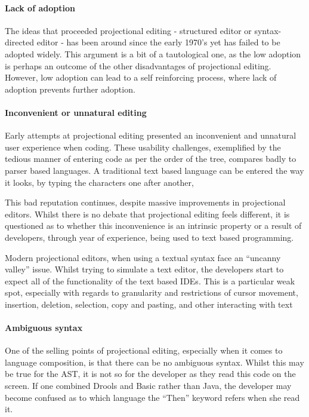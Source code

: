 \paragraph{Lack of adoption}
The ideas that proceeded projectional editing - structured editor or syntax-directed editor - has been around since the early 1970's yet has failed to be adopted widely.
This argument is a bit of a tautological one, as the low adoption is perhaps an outcome of the other disadvantages of projectional editing.
However, low adoption can lead to a self reinforcing process, where lack of adoption prevents further adoption.

\paragraph{Inconvenient or unnatural editing}
Early attempts at projectional editing presented an inconvenient and unnatural user experience when coding.
These usability challenges, exemplified by the tedious manner of entering code as per the order of the tree, compares badly to parser based languages.
A traditional text based language can be entered the way it looks, by typing the characters one after another,

This bad reputation continues, despite massive improvements in projectional editors.
Whilst there is no debate that projectional editing feels different, it is questioned as to whether this inconvenience is an intrinsic property or a result of developers, through year of experience, being used to text based programming.

Modern projectional editors, when using a textual syntax face an ``uncanny valley'' issue.
Whilst trying to simulate a text editor, the developers start to expect all of the functionality of the text based IDEs.
This is a particular weak spot, especially with regards to granularity and restrictions of cursor movement, insertion, deletion, selection, copy and pasting, and other interacting with text

\paragraph{Ambiguous syntax}
One of the selling points of projectional editing, especially when it comes to language composition, is that there can be no ambiguous syntax.
Whilst this may be true for the AST, it is not so for the developer as they read this code on the screen.
If one combined Drools and Basic rather than Java, the developer may become confused as to which language the ``Then'' keyword refers when she read it.

